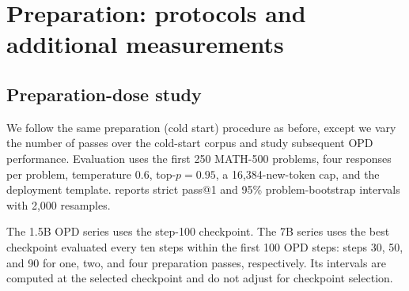 \section{Preparation: protocols and additional measurements}
\label{app:preparation}



\subsection{Preparation-dose study}
\label{app:preparation-legacy}

We follow the same preparation (cold start) procedure as before, except we vary the number of passes over the cold-start corpus and study subsequent OPD performance. Evaluation uses the first 250 MATH-500 problems, four responses per problem, temperature $0.6$, top-$p=0.95$, a 16,384-new-token cap, and the deployment template.  reports strict pass@1 and 95\% problem-bootstrap intervals with 2,000 resamples.

The 1.5B OPD series uses the step-100 checkpoint. The 7B series uses the best checkpoint evaluated every ten steps within the first 100 OPD steps: steps 30, 50, and 90 for one, two, and four preparation passes, respectively. Its intervals are computed at the selected checkpoint and do not adjust for checkpoint selection.


\begin{table}[htbp]
\centering
\small
\setlength{\tabcolsep}{5pt}

\caption{The dose panels of \cref{fig:preparation-aime}: strict MATH-500 pass@1 (first 250 problems, 4 samples per problem) after 1, 2 and 4 preparation passes. The OPD column uses step 100 at 1.5B and the best evaluated checkpoint within 100 steps at 7B. Brackets give 95\% problem-bootstrap intervals at each checkpoint.}
\label{tab:dose-figure}
\end{table}


